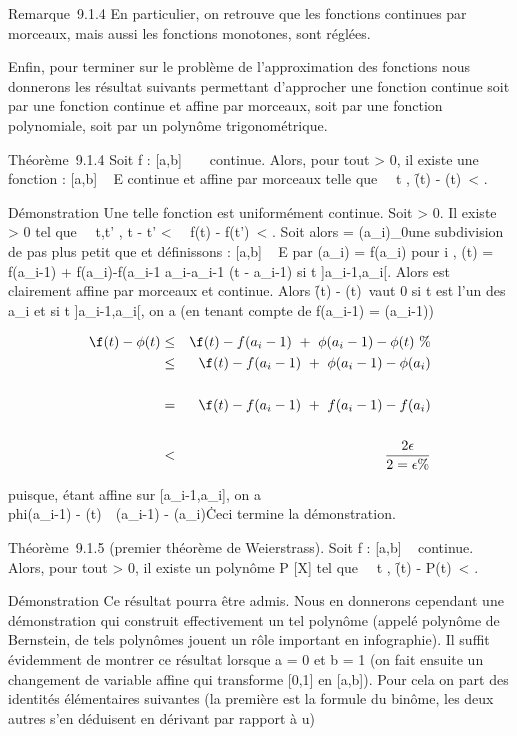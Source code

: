 \documentclass[]{article}
\begin{document}
Remarque~9.1.4 En particulier, on retrouve que les fonctions continues
par morceaux, mais aussi les fonctions monotones, sont réglées.

Enfin, pour terminer sur le problème de l'approximation des fonctions
nous donnerons les résultat suivants permettant d'approcher une fonction
continue soit par une fonction continue et affine par morceaux, soit par
une fonction polynomiale, soit par un polynôme trigonométrique.

Théorème~9.1.4 Soit f : [a,b] \rightarrow~ ~ continue. Alors, pour tout \epsilon
> 0, il existe une fonction \phi : [a,b] \rightarrow~ E continue et
affine par morceaux telle que \forall~~t \in [a,b],
\f(t) - \phi(t)\
< \epsilon.

Démonstration Une telle fonction est uniformément continue. Soit \epsilon
> 0. Il existe \eta > 0 tel que
\forall~~t,t' \in [a,b], t - t'
< \eta \rigtharrow~\ f(t) -
f(t')\ < \epsilon {}
. Soit alors \sigma = (a_i)_0\leqi\leqn une subdivision de pas
plus petit que \eta et définissons \phi : [a,b] \rightarrow~ E par \phi(a_i) =
f(a_i) pour i \in [0,n], \phi(t) = f(a_i-1) +
f(a_i)-f(a_i-1 \over
a_i-a_i-1 (t - a_i-1) si t
\in]a_i-1,a_i[. Alors \phi est clairement affine par
morceaux et continue. Alors \f(t) -
\phi(t)\ vaut 0 si t est l'un des a_i et
si t \in]a_i-1,a_i[, on a (en tenant compte de
f(a_i-1) = \phi(a_i-1))

\begin{align*} \f(t) -
\phi(t)& \leq& \f(t) -
f(a_i-1)\ +\
\phi(a_i-1) - \phi(t)\ \%&
\\ & \leq& \f(t) -
f(a_i-1)\ +\
\phi(a_i-1) - \phi(a_i)\\%
\\ & =& \f(t) -
f(a_i-1)\ +\
f(a_i-1) - f(a_i)\\%
\\ & <& 2 \epsilon
\over 2 = \epsilon \%& \\
\end{align*}

puisque, \phi étant affine sur [a_i-1,a_i], on a
\\phi(a_i-1) -
\phi(t)\ \leq\
\phi(a_i-1) - \phi(a_i)\. Ceci
termine la démonstration.

Théorème~9.1.5 (premier théorème de Weierstrass). Soit f : [a,b] \rightarrow~ 
continue. Alors, pour tout \epsilon > 0, il existe un polynôme P \in
\mathbb{C}[X] tel que \forall~~t \in [a,b],
\f(t) - P(t)\
< \epsilon.

Démonstration Ce résultat pourra être admis. Nous en donnerons cependant
une démonstration qui construit effectivement un tel polynôme (appelé
polynôme de Bernstein, de tels polynômes jouent un rôle important en
infographie). Il suffit évidemment de montrer ce résultat lorsque a = 0
et b = 1 (on fait ensuite un changement de variable affine qui
transforme [0,1] en [a,b]). Pour cela on part des identités
élémentaires suivantes (la première est la formule du binôme, les deux
autres s'en déduisent en dérivant par rapport à u)
\end{document}
